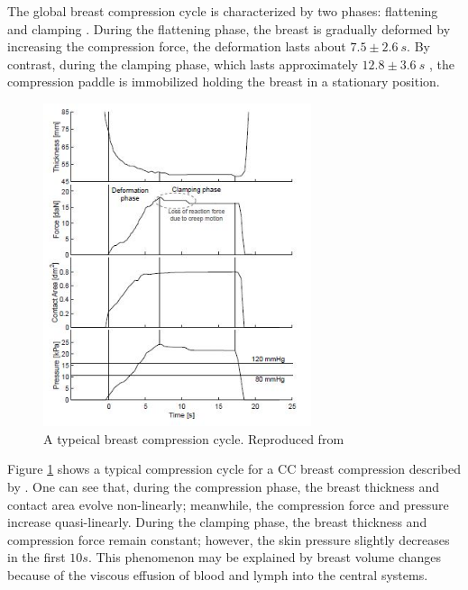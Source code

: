 The global breast compression cycle is characterized by two phases: flattening and clamping \citep{de_pain_2015}. During the flattening phase, the breast is gradually deformed by increasing the compression force, the deformation lasts about  $7.5 \pm 2.6\ s$. By contrast, during the clamping phase, which lasts approximately $12.8 \pm 3.6\ s$ , the compression paddle is immobilized holding the breast in a stationary position. 
\begin{figure}[!h]
\centering
\includegraphics[width=0.7\textwidth,keepaspectratio]{figures/breast_compression_cycle.jpg} 
\caption{A typeical breast compression cycle. Reproduced from \cite{groot_towards_2015}}\label{fig:breast_compression_cycle}
\end{figure}

Figure \ref{fig:breast_compression_cycle} shows a typical compression cycle for a CC breast compression described by \cite{de_pain_2015}. One can see that, during the compression phase, the breast thickness and contact area evolve non-linearly; meanwhile, the compression force and pressure increase quasi-linearly. During the clamping phase, the breast thickness and compression force remain constant; however, the skin pressure slightly decreases in the first $10s$. This phenomenon may be explained by breast volume changes because of the viscous effusion of blood and lymph into the central systems. 

